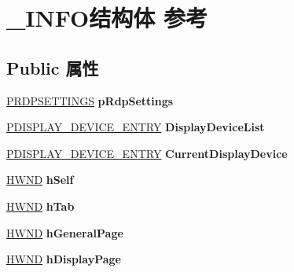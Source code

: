 \hypertarget{struct___i_n_f_o}{}\section{\+\_\+\+I\+N\+F\+O结构体 参考}
\label{struct___i_n_f_o}
\subsection*{Public 属性}
\begin{DoxyCompactItemize}
\item 
\mbox{\label{struct___i_n_f_o_a8f98b974921a0564511fcb6f02e9623d}} 
\hyperlink{struct___r_d_p_s_e_t_t_i_n_g_s}{P\+R\+D\+P\+S\+E\+T\+T\+I\+N\+GS} {\bfseries p\+Rdp\+Settings}
\item 
\mbox{\label{struct___i_n_f_o_a07a5c7a5e178dce4e95426bd5a6764d1}} 
\hyperlink{struct___d_i_s_p_l_a_y___d_e_v_i_c_e___e_n_t_r_y}{P\+D\+I\+S\+P\+L\+A\+Y\+\_\+\+D\+E\+V\+I\+C\+E\+\_\+\+E\+N\+T\+RY} {\bfseries Display\+Device\+List}
\item 
\mbox{\label{struct___i_n_f_o_a4818a8f934d8149720fe6daa29ab883c}} 
\hyperlink{struct___d_i_s_p_l_a_y___d_e_v_i_c_e___e_n_t_r_y}{P\+D\+I\+S\+P\+L\+A\+Y\+\_\+\+D\+E\+V\+I\+C\+E\+\_\+\+E\+N\+T\+RY} {\bfseries Current\+Display\+Device}
\item 
\mbox{\label{struct___i_n_f_o_ad8317dfe5c5db1ce05c5573e177ba1b0}} 
\hyperlink{interfacevoid}{H\+W\+ND} {\bfseries h\+Self}
\item 
\mbox{\label{struct___i_n_f_o_a32d326440f2ac2375167a35d8c4eeb66}} 
\hyperlink{interfacevoid}{H\+W\+ND} {\bfseries h\+Tab}
\item 
\mbox{\label{struct___i_n_f_o_a3c148cc17b81c1cd7d9dfb40867c774e}} 
\hyperlink{interfacevoid}{H\+W\+ND} {\bfseries h\+General\+Page}
\item 
\mbox{\label{struct___i_n_f_o_a94700e7c467c1c03cccc4d831d634ee7}} 
\hyperlink{interfacevoid}{H\+W\+ND} {\bfseries h\+Display\+Page}
\item 
\mbox{\label{struct___i_n_f_o_a24f481a4728df9c882d045b8d31d5c95}} 

\end{DoxyCompactItemize}
